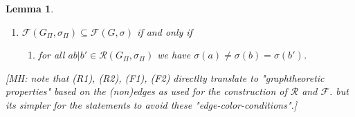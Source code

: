 \documentclass[final,3p,times]{elsarticle}
\newtheorem{lemma}[theorem]{Lemma}%
\newcommand{\TODO}[1]{\begingroup\color{red}#1\endgroup}
\begin{document}
\begin{lemma}
\begin{enumerate}
 		\item $\mathscr{F}(G_\Pi,\sigma_\Pi)  \subseteq  \mathscr{F}(G,\sigma)$
 			  	  if and only if 			  	   
	
			\begin{enumerate}[noitemsep]
 			  	 \item[(F2):] for all $ab|b' \in \mathscr{R}(G_\Pi,\sigma_\Pi)$ we have 
 			  	 $\sigma(a) \neq \sigma(b) = \sigma(b')$. 
			\end{enumerate}			      
	\end{enumerate}
	\TODO{[MH: note that (R1),  (R2),  (F1),  (F2) directlty translate to
	     "graphtheoretic properties" based on the (non)edges as used 
	     for the construction of $\mathscr{R}$ and $\mathscr{F}$. 
	     but its simpler for the statements to avoid these "edge-color-conditions".] }
\end{lemma}
\end{document}
